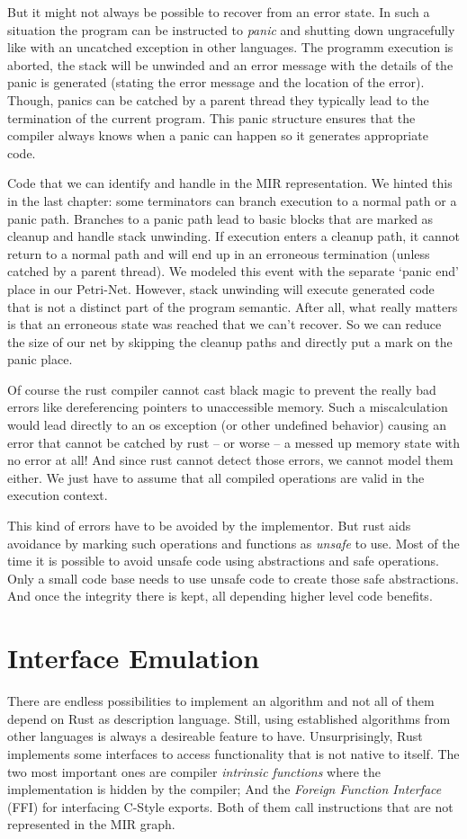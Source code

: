 But it might not always be possible to recover from an error state.
In such a situation the program can be instructed to \textit{panic} and shutting down ungracefully like with an uncatched exception in other languages.
The programm execution is aborted, the stack will be unwinded and an error message with the details of the panic is generated (stating the error message and the location of the error).
Though, panics can be catched by a parent thread they typically lead to the termination of the current program.
This panic structure ensures that the compiler always knows when a panic can happen so it generates appropriate code.

Code that we can identify and handle in the MIR representation.
We hinted this in the last chapter: some terminators can branch execution to a normal path or a panic path.
Branches to a panic path lead to basic blocks that are marked as cleanup and handle stack unwinding.
If execution enters a cleanup path, it cannot return to a normal path and will end up in an erroneous termination (unless catched by a parent thread).
We modeled this event with the separate `panic end' place in our Petri-Net.
However, stack unwinding will execute generated code that is not a distinct part of the program semantic.
After all, what really matters is that an erroneous state was reached that we can't recover.
So we can reduce the size of our net by skipping the cleanup paths and directly put a mark on the panic place.

Of course the rust compiler cannot cast black magic to prevent the really bad errors like dereferencing pointers to unaccessible memory.
Such a miscalculation would lead directly to an os exception (or other undefined behavior) causing an error that cannot be catched by rust -- or worse -- a messed up memory state with no error at all!
And since rust cannot detect those errors, we cannot model them either.
We just have to assume that all compiled operations are valid in the execution context.

This kind of errors have to be avoided by the implementor.
But rust aids avoidance by marking such operations and functions as \textit{unsafe} to use.
Most of the time it is possible to avoid unsafe code using abstractions and safe operations.
Only a small code base needs to use unsafe code to create those safe abstractions. 
And once the integrity there is kept, all depending higher level code benefits.

\section{Interface Emulation}
\label{emulation}
There are endless possibilities to implement an algorithm and not all of them depend on Rust as description language.
Still, using established algorithms from other languages is always a desireable feature to have.
Unsurprisingly, Rust implements some interfaces to access functionality that is not native to itself.
The two most important ones are compiler \textit{intrinsic functions} where the implementation is hidden by the compiler;
And the \textit{Foreign Function Interface} (FFI) for interfacing C-Style exports.
Both of them call instructions that are not represented in the MIR graph.

